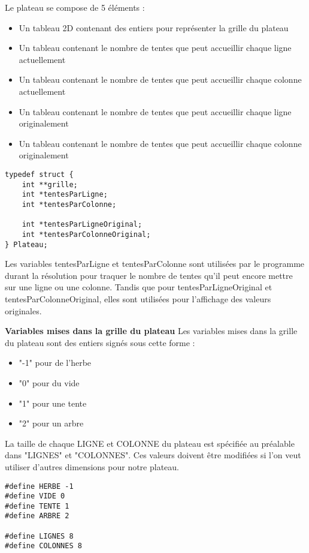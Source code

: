\documentclass{article}
\begin{document}
    Le plateau se compose de 5 éléments :
    \begin{itemize}
    \item Un tableau 2D contenant des entiers pour représenter la grille du plateau
    \item Un tableau contenant le nombre de tentes que peut accueillir chaque ligne actuellement
    \item Un tableau contenant le nombre de tentes que peut accueillir chaque colonne actuellement
    \item Un tableau contenant le nombre de tentes que peut accueillir chaque ligne originalement
    \item Un tableau contenant le nombre de tentes que peut accueillir chaque colonne originalement
    \end{itemize}
\begin{lstlisting}[style=Cstyle]
typedef struct {
    int **grille;
    int *tentesParLigne;
    int *tentesParColonne;

    int *tentesParLigneOriginal;
    int *tentesParColonneOriginal;
} Plateau;
\end{lstlisting}
    Les variables tentesParLigne et tentesParColonne sont utilisées par le programme durant la résolution pour traquer le nombre de tentes qu'il peut encore mettre sur une ligne ou une colonne. Tandis que pour tentesParLigneOriginal et tentesParColonneOriginal, elles sont utilisées pour l'affichage des valeurs originales.

\textbf{Variables mises dans la grille du plateau}
    Les variables mises dans la grille du plateau sont des entiers signés sous cette forme :
    \begin{itemize}
    \item "-1" pour de l'herbe
    \item "0" pour du vide
    \item "1" pour une tente
    \item "2" pour un arbre
    \end{itemize}
    La taille de chaque LIGNE et COLONNE du plateau est spécifiée au préalable dans "LIGNES" et "COLONNES". Ces valeurs doivent être modifiées si l'on veut utiliser d'autres dimensions pour notre plateau.

\begin{lstlisting}[style=Cstyle]
#define HERBE -1
#define VIDE 0
#define TENTE 1
#define ARBRE 2

#define LIGNES 8
#define COLONNES 8
\end{lstlisting}
\end{document}

